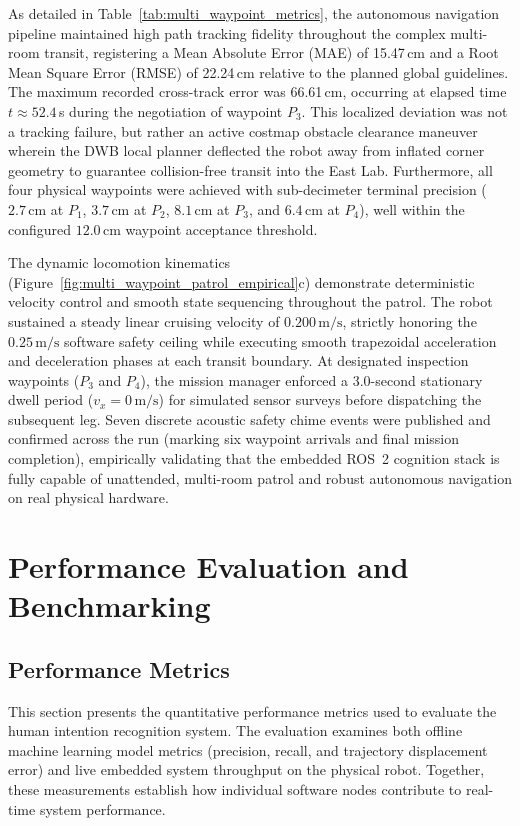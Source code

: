 As detailed in Table~\ref{tab:multi_waypoint_metrics}, the autonomous navigation pipeline maintained high path tracking fidelity throughout the complex multi-room transit, registering a Mean Absolute Error (MAE) of 15.47\,cm and a Root Mean Square Error (RMSE) of 22.24\,cm relative to the planned global guidelines. The maximum recorded cross-track error was 66.61\,cm, occurring at elapsed time $t \approx 52.4$\,s during the negotiation of waypoint $P_3$. This localized deviation was not a tracking failure, but rather an active costmap obstacle clearance maneuver wherein the DWB local planner deflected the robot away from inflated corner geometry to guarantee collision-free transit into the East Lab. Furthermore, all four physical waypoints were achieved with sub-decimeter terminal precision ($2.7\,\text{cm}$ at $P_1$, $3.7\,\text{cm}$ at $P_2$, $8.1\,\text{cm}$ at $P_3$, and $6.4\,\text{cm}$ at $P_4$), well within the configured $12.0\,\text{cm}$ waypoint acceptance threshold.

The dynamic locomotion kinematics (Figure~\ref{fig:multi_waypoint_patrol_empirical}c) demonstrate deterministic velocity control and smooth state sequencing throughout the patrol. The robot sustained a steady linear cruising velocity of $0.200\,\text{m/s}$, strictly honoring the $0.25\,\text{m/s}$ software safety ceiling while executing smooth trapezoidal acceleration and deceleration phases at each transit boundary. At designated inspection waypoints ($P_3$ and $P_4$), the mission manager enforced a 3.0-second stationary dwell period ($v_x = 0\,\text{m/s}$) for simulated sensor surveys before dispatching the subsequent leg. Seven discrete acoustic safety chime events were published and confirmed across the run (marking six waypoint arrivals and final mission completion), empirically validating that the embedded ROS~2 cognition stack is fully capable of unattended, multi-room patrol and robust autonomous navigation on real physical hardware.

\section{Performance Evaluation and Benchmarking}

\subsection{Performance Metrics}
This section presents the quantitative performance metrics used to evaluate the human intention recognition system. The evaluation examines both offline machine learning model metrics (precision, recall, and trajectory displacement error) and live embedded system throughput on the physical robot. Together, these measurements establish how individual software nodes contribute to real-time system performance.


